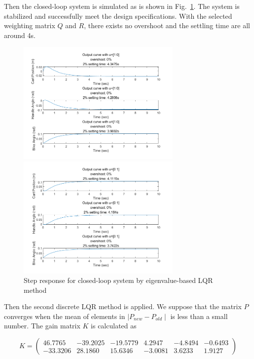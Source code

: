 \documentclass[hyperref]{article}
\theoremstyle{nonumberplain}
\begin{document}
	Then the closed-loop system is simulated as is shown in Fig.~\ref{fig10}. The system is stabilized and successfully meet the design specifications. With the selected weighting matrix $Q$ and $R$, there exists no overshoot and the settling time are all around 4s.
		
	\begin{figure}[htbp]
		\centering
		\begin{minipage}[t]{0.48\textwidth}
			\centering
			\includegraphics[width=8cm]{fig12.png}
		\end{minipage}
		\begin{minipage}[t]{0.48\textwidth}
			\centering
			\includegraphics[width=8cm]{fig13.png}
		\end{minipage}
		\caption{Step response for closed-loop system by eigenvalue-based LQR method}
		\label{fig10}
	\end{figure}
	
	Then the second discrete LQR method is applied. We suppose that the matrix $P$ converges when the mean of elements in $\mid P_{new}-P_{old} \mid$ is less than a small number. The gain matrix $K$ is calculated as
	
	\begin{equation}
	K=\begin{pmatrix}
	46.7765 &-39.2025  &-19.5779  &4.2947  &-4.8494  &-0.6493 \\ 
	-33.3206 &28.1860  &15.6346  &-3.0081  &3.6233  &1.9127 
	\end{pmatrix}
	\nonumber
	\end{equation}
	
\end{document}
